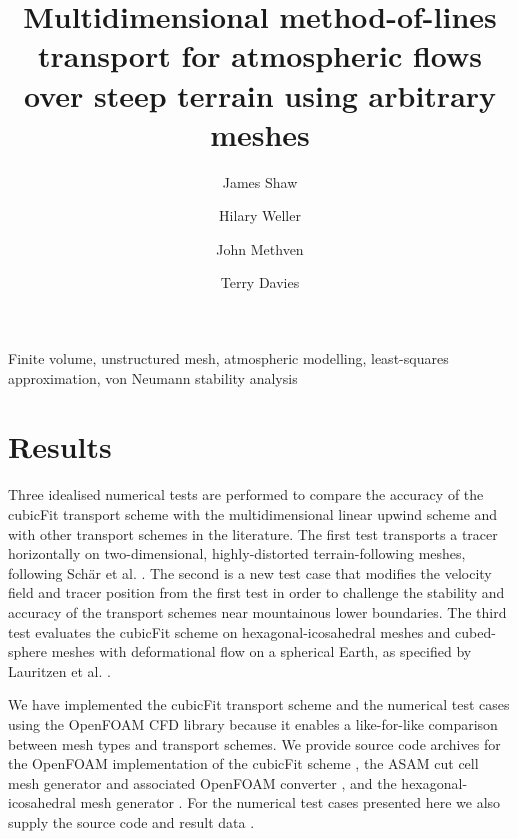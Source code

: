 \documentclass[times]{elsarticle}
\newcommand{\revone}[1]{#1}
\begin{document}
\begin{frontmatter}
\title{Multidimensional method-of-lines transport for atmospheric flows over steep terrain using arbitrary meshes}
\author[uor]{James Shaw}
\author[uor]{Hilary Weller}
\author[uor]{John Methven}
\author[mo]{Terry Davies}

\address[uor]{Department of Meteorology, University of Reading, Reading, United Kingdom}
\address[mo]{Met Office, Exeter, United Kingdom}



\begin{keyword}
	Finite volume, unstructured mesh, atmospheric modelling, least-squares approximation, von Neumann stability analysis
\end{keyword}
\end{frontmatter}





\section{Results}
\label{sec:results}

Three idealised numerical tests are performed to compare the accuracy of the cubicFit transport scheme with the multidimensional linear upwind scheme and with other transport schemes in the literature.  The first test transports a tracer horizontally on two-dimensional, highly-distorted terrain-following meshes, following Sch\"{a}r et al. \citep{schaer2002}.
The second is a new test case that modifies the velocity field and tracer position from the first test in order to challenge the stability and accuracy of the transport schemes near mountainous lower boundaries.
The third test evaluates the cubicFit scheme on \revone{hexagonal-icosahedral meshes} and cubed-sphere meshes with deformational flow on a spherical Earth, as specified by Lauritzen et al. \citep{lauritzen2012}.

We have implemented the cubicFit transport scheme and the numerical test cases using the OpenFOAM CFD library because it enables a like-for-like comparison between mesh types and transport schemes.  We provide source code archives for the OpenFOAM implementation of the cubicFit scheme \citep{atmosfoam}, the ASAM cut cell mesh generator \citep{asam_grid} and associated OpenFOAM converter \citep{gmv2openfoam}, and the hexagonal-icosahedral mesh generator \citep{geodesic-mesh}.  For the numerical test cases presented here we also supply the source code \citep{atmostests} and result data \citep{atmostests-data}.
\end{document}
